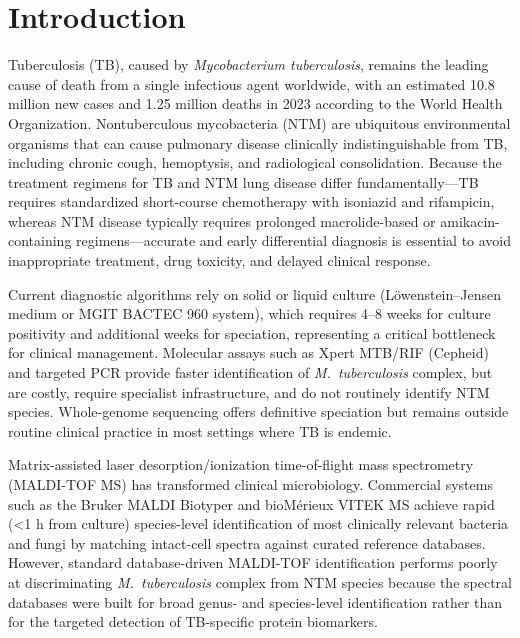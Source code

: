 \documentclass[journal=ancham, manuscript=article, layout=traditional]{achemso}
\begin{document}
\linenumbers

\section{Introduction}

Tuberculosis (TB), caused by \textit{Mycobacterium tuberculosis},
remains the leading cause of death from a single infectious agent
worldwide, with an estimated 10.8 million new cases and 1.25 million
deaths in 2023 according to the World Health Organization.\cite{WHO2024}
Nontuberculous mycobacteria (NTM) are ubiquitous environmental
organisms that can cause pulmonary disease clinically indistinguishable
from TB, including chronic cough, hemoptysis, and radiological
consolidation.\cite{Daley2020NTM}
Because the treatment regimens for TB and NTM lung disease differ
fundamentally---TB requires standardized short-course chemotherapy with
isoniazid and rifampicin, whereas NTM disease typically requires
prolonged macrolide-based or amikacin-containing
regimens---accurate and early differential diagnosis is essential to
avoid inappropriate treatment, drug toxicity, and delayed clinical
response.\cite{Winthrop2020NTM, Griffith2007ATS}

Current diagnostic algorithms rely on solid or liquid culture
(Löwenstein--Jensen medium or MGIT BACTEC 960 system), which requires
4--8 weeks for culture positivity and additional weeks for speciation,
representing a critical bottleneck for clinical
management.\cite{Daley2020NTM, Minion2010}
Molecular assays such as Xpert MTB/RIF (Cepheid) and targeted
PCR provide faster identification of \textit{M.~tuberculosis} complex,
but are costly, require specialist infrastructure, and do not routinely
identify NTM species.\cite{Steingart2014Xpert}
Whole-genome sequencing offers definitive speciation but remains
outside routine clinical practice in most settings where TB is
endemic.\cite{Votintseva2017WGS}

Matrix-assisted laser desorption/ionization time-of-flight mass
spectrometry (MALDI-TOF MS) has transformed clinical
microbiology.\cite{Seng2009MALDI, Lagier2015}
Commercial systems such as the Bruker MALDI Biotyper and
bioMérieux VITEK MS achieve rapid (\textless{}1 h from
culture) species-level identification of most clinically relevant
bacteria and fungi by matching intact-cell spectra against curated
reference databases.\cite{van_Veen2010, Carbonnelle2012}
However, standard database-driven MALDI-TOF identification performs
poorly at discriminating \textit{M.~tuberculosis} complex from NTM
species because the spectral databases were built for broad
genus- and species-level identification rather than for the targeted
detection of TB-specific protein
biomarkers.\cite{Mather2011MALDI_Myco, El_Khechine2011}
\end{document}
